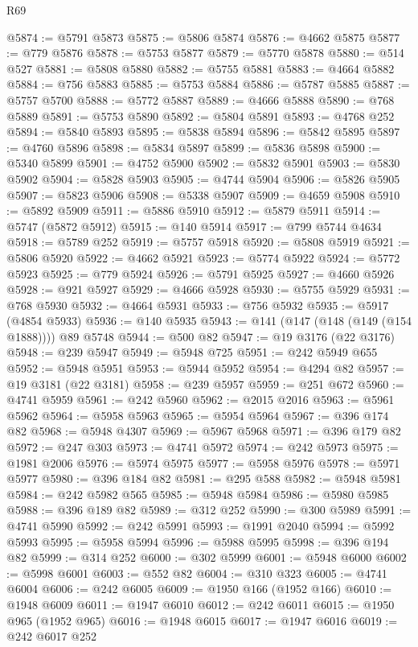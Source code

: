 \begin{lexlean}{R69}
\begin{coremodule}
{@5874 := @5791 @5873
@5875 := @5806 @5874
@5876 := @4662 @5875
@5877 := @779 @5876
@5878 := @5753 @5877
@5879 := @5770 @5878
@5880 := @514 @527
@5881 := @5808 @5880
@5882 := @5755 @5881
@5883 := @4664 @5882
@5884 := @756 @5883
@5885 := @5753 @5884
@5886 := @5787 @5885
@5887 := @5757 @5700
@5888 := @5772 @5887
@5889 := @4666 @5888
@5890 := @768 @5889
@5891 := @5753 @5890
@5892 := @5804 @5891
@5893 := @4768 @252
@5894 := @5840 @5893
@5895 := @5838 @5894
@5896 := @5842 @5895
@5897 := @4760 @5896
@5898 := @5834 @5897
@5899 := @5836 @5898
@5900 := @5340 @5899
@5901 := @4752 @5900
@5902 := @5832 @5901
@5903 := @5830 @5902
@5904 := @5828 @5903
@5905 := @4744 @5904
@5906 := @5826 @5905
@5907 := @5823 @5906
@5908 := @5338 @5907
@5909 := @4659 @5908
@5910 := @5892 @5909
@5911 := @5886 @5910
@5912 := @5879 @5911
@5914 := @5747 (@5872 @5912)
@5915 := @140 @5914
@5917 := @799 @5744 @4634
@5918 := @5789 @252
@5919 := @5757 @5918
@5920 := @5808 @5919
@5921 := @5806 @5920
@5922 := @4662 @5921
@5923 := @5774 @5922
@5924 := @5772 @5923
@5925 := @779 @5924
@5926 := @5791 @5925
@5927 := @4660 @5926
@5928 := @921 @5927
@5929 := @4666 @5928
@5930 := @5755 @5929
@5931 := @768 @5930
@5932 := @4664 @5931
@5933 := @756 @5932
@5935 := @5917 (@4854 @5933)
@5936 := @140 @5935
@5943 := @141 (@147 (@148 (@149 (@154 @1888)))) @89 @5748
@5944 := @500 @82
@5947 := @19 @3176 (@22 @3176)
@5948 := @239 @5947
@5949 := @5948 @725
@5951 := @242 @5949 @655
@5952 := @5948 @5951
@5953 := @5944 @5952
@5954 := @4294 @82
@5957 := @19 @3181 (@22 @3181)
@5958 := @239 @5957
@5959 := @251 @672
@5960 := @4741 @5959
@5961 := @242 @5960
@5962 := @2015 @2016
@5963 := @5961 @5962
@5964 := @5958 @5963
@5965 := @5954 @5964
@5967 := @396 @174 @82
@5968 := @5948 @4307
@5969 := @5967 @5968
@5971 := @396 @179 @82
@5972 := @247 @303
@5973 := @4741 @5972
@5974 := @242 @5973
@5975 := @1981 @2006
@5976 := @5974 @5975
@5977 := @5958 @5976
@5978 := @5971 @5977
@5980 := @396 @184 @82
@5981 := @295 @588
@5982 := @5948 @5981
@5984 := @242 @5982 @565
@5985 := @5948 @5984
@5986 := @5980 @5985
@5988 := @396 @189 @82
@5989 := @312 @252
@5990 := @300 @5989
@5991 := @4741 @5990
@5992 := @242 @5991
@5993 := @1991 @2040
@5994 := @5992 @5993
@5995 := @5958 @5994
@5996 := @5988 @5995
@5998 := @396 @194 @82
@5999 := @314 @252
@6000 := @302 @5999
@6001 := @5948 @6000
@6002 := @5998 @6001
@6003 := @552 @82
@6004 := @310 @323
@6005 := @4741 @6004
@6006 := @242 @6005
@6009 := @1950 @166 (@1952 @166)
@6010 := @1948 @6009
@6011 := @1947 @6010
@6012 := @242 @6011
@6015 := @1950 @965 (@1952 @965)
@6016 := @1948 @6015
@6017 := @1947 @6016
@6019 := @242 @6017 @252
}
\end{coremodule}
\end{lexlean}
